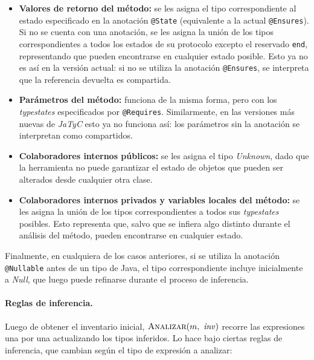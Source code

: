 \begin{itemize}
    \item \textbf{Valores de retorno del método:} se les asigna el tipo correspondiente al estado especificado en la anotación \texttt{@State} (equivalente a la actual \texttt{@Ensures}). Si no se cuenta con una anotación, se les asigna la unión de los tipos correspondientes a todos los estados de su protocolo excepto el reservado \texttt{end}, representando que pueden encontrarse en cualquier estado posible. Esto ya no es así en la versión actual: si no se utiliza la anotación \texttt{@Ensures}, se interpreta que la referencia devuelta es compartida.
    \item \textbf{Parámetros del método:} funciona de la misma forma, pero con los \textit{typestates} especificados por \texttt{@Requires}. Similarmente, en las versiones más nuevas de \textit{JaTyC} esto ya no funciona así: los parámetros sin la anotación se interpretan como compartidos.
    \item \textbf{Colaboradores internos públicos:} se les asigna el tipo \textit{Unknown}, dado que la herramienta no puede garantizar el estado de objetos que pueden ser alterados desde cualquier otra clase.
    \item \textbf{Colaboradores internos privados y variables locales del método:} se les asigna la unión de los tipos correspondientes a todos sus \textit{typestates} posibles. Esto representa que, salvo que se infiera algo distinto durante el análisis del método, pueden encontrarse en cualquier estado.
\end{itemize}

Finalmente, en cualquiera de los casos anteriores, si se utiliza la anotación \texttt{@Nullable} antes de un tipo de Java, el tipo correspondiente incluye inicialmente a \textit{Null}, que luego puede refinarse durante el proceso de inferencia.

\paragraph{Reglas de inferencia.}
Luego de obtener el inventario inicial, $\textsc{Analizar}(m,\ \mathit{inv})$ recorre las expresiones una por una actualizando los tipos inferidos. Lo hace bajo ciertas reglas de inferencia, que cambian según el tipo de expresión a analizar:

